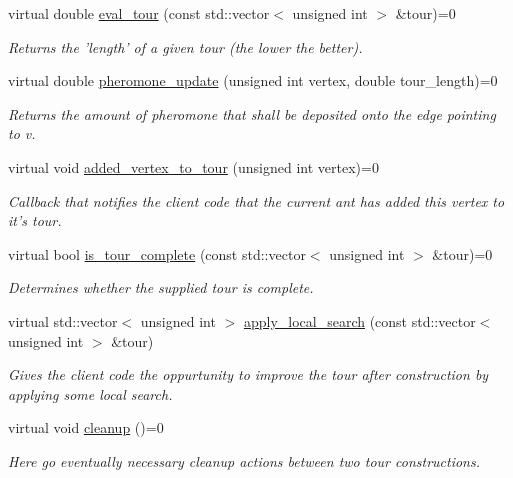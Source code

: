 \begin{CompactItemize}
virtual double \hyperlink{classOptimizationProblem_7e89680c220a5b45c716127145227034}{eval\_\-tour} (const std::vector$<$ unsigned int $>$ \&tour)=0
\begin{CompactList}\small\item\em Returns the 'length' of a given tour (the lower the better). \item\end{CompactList}\item 
virtual double \hyperlink{classOptimizationProblem_835a3b10f21b237610a9c2b9999c3589}{pheromone\_\-update} (unsigned int vertex, double tour\_\-length)=0
\begin{CompactList}\small\item\em Returns the amount of pheromone that shall be deposited onto the edge pointing to v. \item\end{CompactList}\item 
virtual void \hyperlink{classOptimizationProblem_3df069cbd0e948368a5696b21892cb7a}{added\_\-vertex\_\-to\_\-tour} (unsigned int vertex)=0
\begin{CompactList}\small\item\em Callback that notifies the client code that the current ant has added this vertex to it's tour. \item\end{CompactList}\item 
virtual bool \hyperlink{classOptimizationProblem_41c614f3cb6cc0d96fa34adf129ff47f}{is\_\-tour\_\-complete} (const std::vector$<$ unsigned int $>$ \&tour)=0
\begin{CompactList}\small\item\em Determines whether the supplied tour is complete. \item\end{CompactList}\item 
virtual std::vector$<$ unsigned int $>$ \hyperlink{classOptimizationProblem_74c083b6b88c801052af5dbfa06644e0}{apply\_\-local\_\-search} (const std::vector$<$ unsigned int $>$ \&tour)
\begin{CompactList}\small\item\em Gives the client code the oppurtunity to improve the tour after construction by applying some local search. \item\end{CompactList}\item 
\hypertarget{classOptimizationProblem_78e513c392ac1c5489b598b275cfef26}{
virtual void \hyperlink{classOptimizationProblem_78e513c392ac1c5489b598b275cfef26}{cleanup} ()=0}
\label{classOptimizationProblem_78e513c392ac1c5489b598b275cfef26}

\begin{CompactList}\small\item\em Here go eventually necessary cleanup actions between two tour constructions. \item\end{CompactList}\end{CompactItemize}


